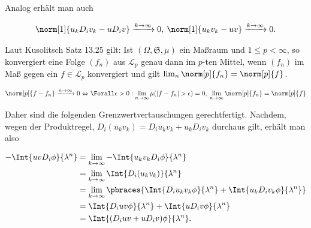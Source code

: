 \begin{solution}
Analog erhält man auch

\begin{align*}
  \norm[1]{u_k D_i v_k - u D_i v}
  \xrightarrow{k \to \infty} 0, \:
  \norm[1]{u_k v_k - uv}
  \xrightarrow{k \to \infty} 0.
\end{align*}

Laut Kusolitsch Satz 13.25 gilt: Ist $(\Omega, \mathfrak{S}, \mu)$ ein Maßraum und $1 \leq p < \infty$, so konvergiert eine Folge $(f_n)$ aus $\mathcal{L}_p$ genau dann im $p$-ten Mittel, wenn $(f_n)$ im Maß gegen ein $f \in \mathcal{L}_p$ konvergiert und gilt $\lim_n \norm[p]{f_n} = \norm[p]{f}$.

\begin{align*}
  \norm[p]{f - f_n}
  \xrightarrow{n \to \infty} 0
  \Leftrightarrow
  \Forall \epsilon > 0:
  \lim_{n \to \infty} \mu(|f - f_n| > \epsilon) = 0, \:
  \lim_{n \to \infty} \norm[p]{f_n} = \norm[p]{f}
\end{align*}

Daher sind die folgenden Grenzwertvertauschungen gerechtfertigt. Nachdem, wegen der Produktregel, $D_i(u_k v_k) = D_i u_k v_k + u_k D_i v_k$ durchaus gilt, erhält man also

\begin{align*}
  - \Int{uv D_i \phi}{\lambda^n}
  & = \lim_{k \to \infty} - \Int{u_k v_k D_i \phi}{\lambda^n} \\
  & = \lim_{k \to \infty} \Int{D_i(u_k v_k)}{\lambda^n} \\
  & = \lim_{k \to \infty}
      \pbraces
      {
        \Int{D_i u_k v_k \phi}{\lambda^n} +
        \Int{u_k D_i v_k \phi}{\lambda^n}
      } \\
  & = \Int{D_i u v \phi}{\lambda^n} +
      \Int{u D_i v \phi}{\lambda^n} \\
  & = \Int{(D_i u v + u D_i v) \phi}{\lambda^n}.
\end{align*}

\end{solution}

